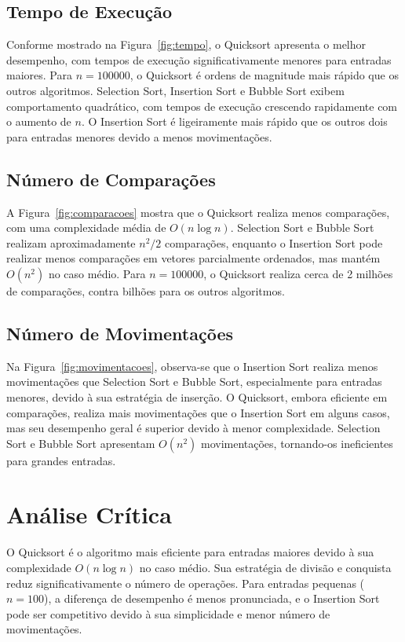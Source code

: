 \documentclass[12pt]{article}
\begin{document}
	\subsection{Tempo de Execução}
	Conforme mostrado na Figura~\ref{fig:tempo}, o Quicksort apresenta o melhor desempenho, com tempos de execução significativamente menores para entradas maiores. Para $n=100000$, o Quicksort é ordens de magnitude mais rápido que os outros algoritmos. Selection Sort, Insertion Sort e Bubble Sort exibem comportamento quadrático, com tempos de execução crescendo rapidamente com o aumento de $n$. O Insertion Sort é ligeiramente mais rápido que os outros dois para entradas menores devido a menos movimentações.
	
	\subsection{Número de Comparações}
	A Figura~\ref{fig:comparacoes} mostra que o Quicksort realiza menos comparações, com uma complexidade média de $O(n \log n)$. Selection Sort e Bubble Sort realizam aproximadamente $n^2/2$ comparações, enquanto o Insertion Sort pode realizar menos comparações em vetores parcialmente ordenados, mas mantém $O(n^2)$ no caso médio. Para $n=100000$, o Quicksort realiza cerca de 2 milhões de comparações, contra bilhões para os outros algoritmos.
	
	\subsection{Número de Movimentações}
	Na Figura~\ref{fig:movimentacoes}, observa-se que o Insertion Sort realiza menos movimentações que Selection Sort e Bubble Sort, especialmente para entradas menores, devido à sua estratégia de inserção. O Quicksort, embora eficiente em comparações, realiza mais movimentações que o Insertion Sort em alguns casos, mas seu desempenho geral é superior devido à menor complexidade. Selection Sort e Bubble Sort apresentam $O(n^2)$ movimentações, tornando-os ineficientes para grandes entradas.
	
	\section{Análise Crítica}
	O Quicksort é o algoritmo mais eficiente para entradas maiores devido à sua complexidade $O(n \log n)$ no caso médio. Sua estratégia de divisão e conquista reduz significativamente o número de operações. Para entradas pequenas ($n=100$), a diferença de desempenho é menos pronunciada, e o Insertion Sort pode ser competitivo devido à sua simplicidade e menor número de movimentações.
	
\end{document}
